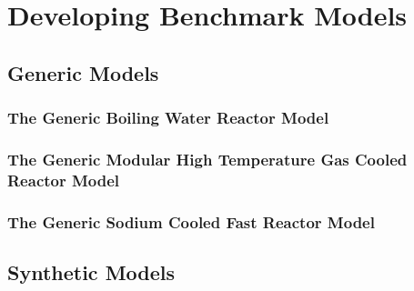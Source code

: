\chapter{Developing Benchmark Models}

\section{Generic Models}


\subsection{The Generic Boiling Water Reactor Model}
\subsection{The Generic Modular High Temperature Gas Cooled Reactor Model}
\subsection{The Generic Sodium Cooled Fast Reactor Model}

\section{Synthetic Models}

